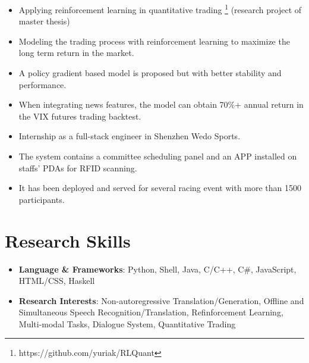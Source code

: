 \documentclass{resume_en}
\begin{document}
\begin{itemize}
    \item Applying reinforcement learning in quantitative trading \footnote{https://github.com/yuriak/RLQuant} (research project of master thesis)
    \item Modeling the trading process with reinforcement learning to maximize the long term return in the market.
    \item A policy gradient based model is proposed but with better stability and performance.
    \item When integrating news features, the model can obtain 70\%+ annual return in the VIX futures trading backtest.
\end{itemize}

\begin{itemize}
    \item Internship as a full-stack engineer in Shenzhen Wedo Sports.
    \item The system contains a committee scheduling panel and an APP installed on staffs' PDAs for RFID scanning.
    \item It has been deployed and served for several racing event with more than 1500 participants.
\end{itemize}

\section{Research Skills}
\begin{itemize}[parsep=0.2ex]
  \item \textbf{Language \& Frameworks}: Python, Shell, Java, C/C++, C\#, JavaScript, HTML/CSS, Haskell
  \item \textbf{Research Interests}: Non-autoregressive Translation/Generation, Offline and Simultaneous Speech Recognition/Translation, Refinforcement Learning, Multi-modal Tasks, Dialogue System, Quantitative Trading
\end{itemize}
\end{document}
